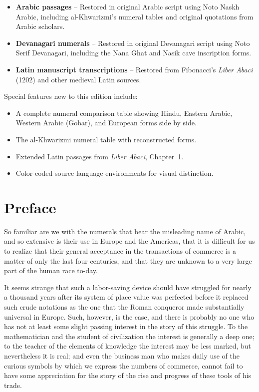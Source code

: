 \documentclass[11pt,a4paper]{article}
\begin{document}
\begin{itemize}[leftmargin=2em,itemsep=0.8ex]
\item \textbf{Arabic passages} -- Restored in original Arabic script using Noto Naskh Arabic, including al-Khwarizmi's numeral tables and original quotations from Arabic scholars.
\item \textbf{Devanagari numerals} -- Restored in original Devanagari script using Noto Serif Devanagari, including the Nana Ghat and Nasik cave inscription forms.
\item \textbf{Latin manuscript transcriptions} -- Restored from Fibonacci's \textit{Liber Abaci} (1202) and other medieval Latin sources.
\end{itemize}

Special features new to this edition include:
\begin{itemize}[leftmargin=2em,itemsep=0.8ex]
\item A complete numeral comparison table showing Hindu, Eastern Arabic, Western Arabic (Gobar), and European forms side by side.
\item The al-Khwarizmi numeral table with reconstructed forms.
\item Extended Latin passages from \textit{Liber Abaci}, Chapter~1.
\item Color-coded source language environments for visual distinction.
\end{itemize}

\newpage

\section*{Preface}

So familiar are we with the numerals that bear the misleading name of Arabic, and so extensive is their use in Europe and the Americas, that it is difficult for us to realize that their general acceptance in the transactions of commerce is a matter of only the last four centuries, and that they are unknown to a very large part of the human race to-day.

It seems strange that such a labor-saving device should have struggled for nearly a thousand years after its system of place value was perfected before it replaced such crude notations as the one that the Roman conqueror made substantially universal in Europe. Such, however, is the case, and there is probably no one who has not at least some slight passing interest in the story of this struggle. To the mathematician and the student of civilization the interest is generally a deep one; to the teacher of the elements of knowledge the interest may be less marked, but nevertheless it is real; and even the business man who makes daily use of the curious symbols by which we express the numbers of commerce, cannot fail to have some appreciation for the story of the rise and progress of these tools of his trade.
\end{document}
